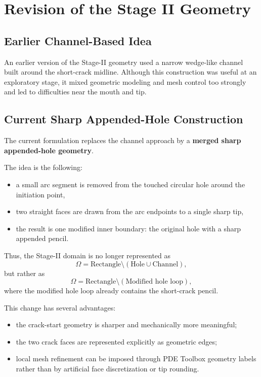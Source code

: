 \documentclass[11pt]{article}
\begin{document}
	\section{Revision of the Stage II Geometry}
	
	\subsection{Earlier Channel-Based Idea}
	
	An earlier version of the Stage-II geometry used a narrow wedge-like channel built around the short-crack midline. Although this construction was useful at an exploratory stage, it mixed geometric modeling and mesh control too strongly and led to difficulties near the mouth and tip.
	
	\subsection{Current Sharp Appended-Hole Construction}
	
	The current formulation replaces the channel approach by a \textbf{merged sharp appended-hole geometry}.
	
	The idea is the following:
	\begin{itemize}
		\item a small arc segment is removed from the touched circular hole around the initiation point,
		\item two straight faces are drawn from the arc endpoints to a single sharp tip,
		\item the result is one modified inner boundary: the original hole with a sharp appended pencil.
	\end{itemize}
	
	Thus, the Stage-II domain is no longer represented as
	\[
	\Omega = \text{Rectangle} \setminus (\text{Hole} \cup \text{Channel}),
	\]
	but rather as
	\[
	\Omega = \text{Rectangle} \setminus (\text{Modified hole loop}),
	\]
	where the modified hole loop already contains the short-crack pencil.
	
	This change has several advantages:
	\begin{itemize}
		\item the crack-start geometry is sharper and mechanically more meaningful;
		\item the two crack faces are represented explicitly as geometric edges;
		\item local mesh refinement can be imposed through PDE Toolbox geometry labels rather than by artificial face discretization or tip rounding.
	\end{itemize}
	
\end{document}
